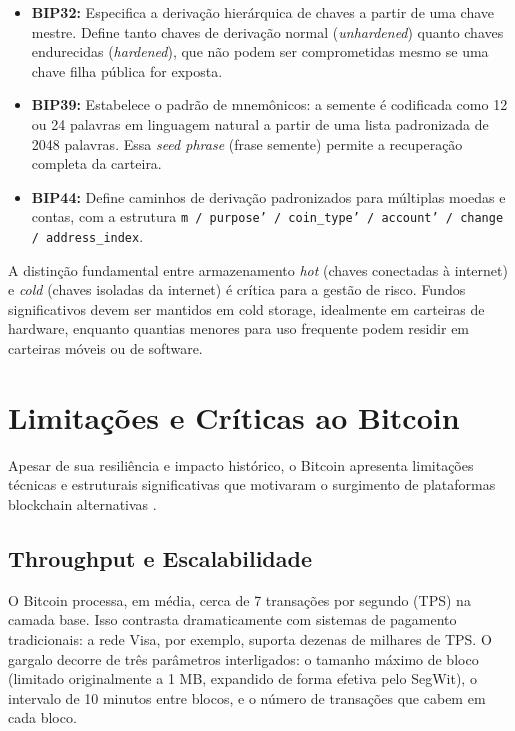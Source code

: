 \documentclass[12pt,a4paper]{report}
\begin{document}
\begin{itemize}
    \item \textbf{BIP32:} Especifica a derivação hierárquica de chaves a partir de uma chave mestre. Define tanto chaves de derivação normal (\textit{unhardened}) quanto chaves endurecidas (\textit{hardened}), que não podem ser comprometidas mesmo se uma chave filha pública for exposta.
    \item \textbf{BIP39:} Estabelece o padrão de mnemônicos: a semente é codificada como 12 ou 24 palavras em linguagem natural a partir de uma lista padronizada de 2048 palavras. Essa \textit{seed phrase} (frase semente) permite a recuperação completa da carteira.
    \item \textbf{BIP44:} Define caminhos de derivação padronizados para múltiplas moedas e contas, com a estrutura \texttt{m / purpose' / coin\_type' / account' / change / address\_index}.
\end{itemize}

A distinção fundamental entre armazenamento \textit{hot} (chaves conectadas à internet) e \textit{cold} (chaves isoladas da internet) é crítica para a gestão de risco. Fundos significativos devem ser mantidos em cold storage, idealmente em carteiras de hardware, enquanto quantias menores para uso frequente podem residir em carteiras móveis ou de software.

\section{Limitações e Críticas ao Bitcoin}

Apesar de sua resiliência e impacto histórico, o Bitcoin apresenta limitações técnicas e estruturais significativas que motivaram o surgimento de plataformas blockchain alternativas \cite{Bashir2023}.

\subsection{Throughput e Escalabilidade}

O Bitcoin processa, em média, cerca de 7 transações por segundo (TPS) na camada base. Isso contrasta dramaticamente com sistemas de pagamento tradicionais: a rede Visa, por exemplo, suporta dezenas de milhares de TPS. O gargalo decorre de três parâmetros interligados: o tamanho máximo de bloco (limitado originalmente a 1 MB, expandido de forma efetiva pelo SegWit), o intervalo de 10 minutos entre blocos, e o número de transações que cabem em cada bloco.
\end{document}
